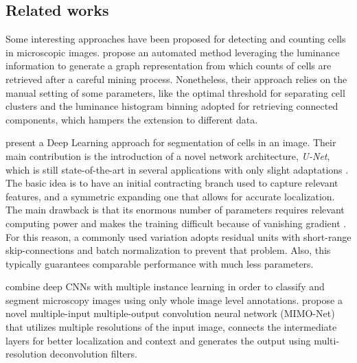 \subsection{Related works}
\label{sec:related_works}

Some interesting approaches have been proposed for detecting and counting cells in microscopic images.
 propose an automated method leveraging the luminance information to generate a graph representation from which counts of cells are retrieved after a careful mining process. Nonetheless, their approach relies on the manual setting of some parameters, like the optimal threshold for separating cell clusters and the luminance histogram binning adopted for retrieving connected components, which hampers the extension to different data.

 present a Deep Learning approach for segmentation of cells in an image. 
Their main contribution is the introduction of a novel network architecture, \textit{U-Net}, which is still state-of-the-art in several applications with only slight adaptations \cite{masin2021novel, ritch2020axonet}. 
The basic idea is to have an initial contracting branch used to capture relevant features, and a symmetric expanding one that allows for accurate localization.
The main drawback is that its enormous number of parameters requires relevant computing power and makes the training difficult because of vanishing gradient \cite{vanishing_gradient}. 
For this reason, a commonly used variation adopts residual units \cite{residual_units} with short-range skip-connections and batch normalization to prevent that problem.
Also, this typically guarantees comparable performance with much less parameters.

 combine deep CNNs with multiple instance learning in order to classify and segment microscopy images using only whole image level annotations. 
 propose a novel multiple-input multiple-output convolution neural network (MIMO-Net) that utilizes multiple resolutions of the input image, connects the intermediate layers for better localization and context and generates the output using multi-resolution deconvolution filters.

